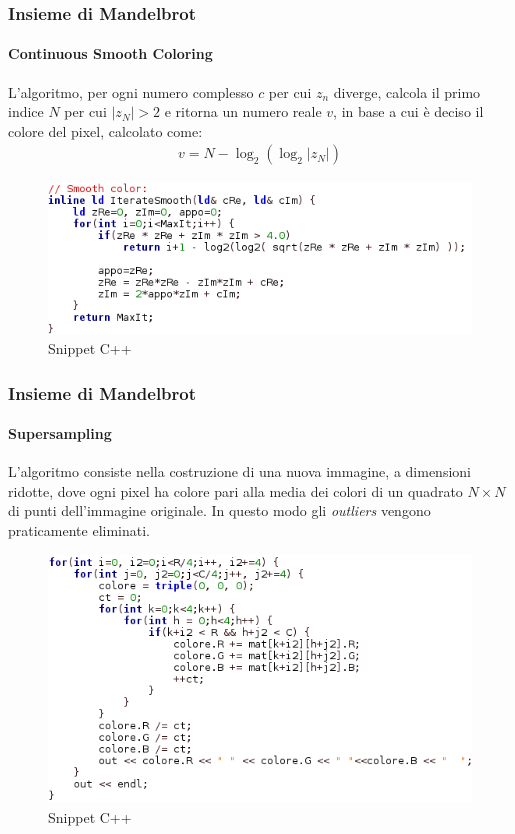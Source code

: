 \documentclass{beamer}
\begin{document}
			\begin{frame}
				\frametitle{Insieme di Mandelbrot}
				\framesubtitle{Continuous Smooth Coloring}
				L'algoritmo, per ogni numero complesso $c$ per cui $z_n$ diverge, calcola il primo indice $N$ per cui $|z_N| > 2$ e ritorna un numero reale $v$, in base a cui è deciso il colore del pixel, calcolato come:
				\begin{gather*}
				v = N - \log_2(\log_2|z_N|)
				\end{gather*}
				\begin{figure}[h]
					\centering
					\includegraphics[width=1\linewidth]{"../Insieme di Mandelbrot/smooth"}
					\caption{Snippet C++}
					\label{fig:smooth}
				\end{figure}
			\end{frame}
			\begin{frame}
				\frametitle{Insieme di Mandelbrot}
				\framesubtitle{Supersampling}
				L'algoritmo consiste nella costruzione di una nuova immagine, a dimensioni ridotte, dove ogni pixel ha colore pari alla media dei colori di un quadrato $N \times N$ di punti dell'immagine originale. In questo modo gli \textit{outliers} vengono praticamente eliminati.
				\begin{figure}[h]
					\centering
					\includegraphics[width=0.8\linewidth]{"../Insieme di Mandelbrot/supersampling"}
					\caption{Snippet C++}
					\label{fig:supersampling}
				\end{figure}

			\end{frame}
\end{document}
